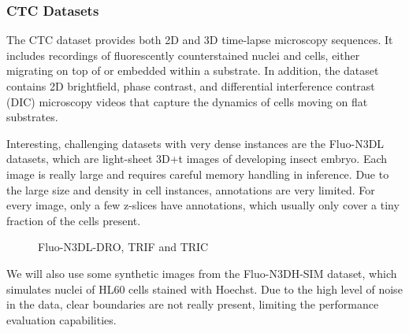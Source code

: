 \subsubsection{CTC Datasets}

The CTC dataset provides both 2D and 3D time-lapse microscopy sequences. It includes recordings of fluorescently counterstained nuclei and cells, either migrating on top of or embedded within a substrate. In addition, the dataset contains 2D brightfield, phase contrast, and differential interference contrast (DIC) microscopy videos that capture the dynamics of cells moving on flat substrates. 

Interesting, challenging datasets with very dense instances are the Fluo-N3DL datasets, which are light-sheet 3D+t images of developing insect embryo. Each image is really large and requires careful memory handling in inference. Due to the large size and density in cell instances, annotations are very limited. For every image, only a few z-slices have annotations, which usually only cover a tiny fraction of the cells present.

\begin{figure}[!ht]
    \centering
    \caption{Fluo-N3DL-DRO, TRIF and TRIC}
    \label{fig:slicing}
\end{figure}


We will also use some synthetic images from the Fluo-N3DH-SIM dataset, which simulates nuclei of HL60 cells stained with Hoechst. Due to the high level of noise in the data, clear boundaries are not really present, limiting the performance evaluation capabilities. 

